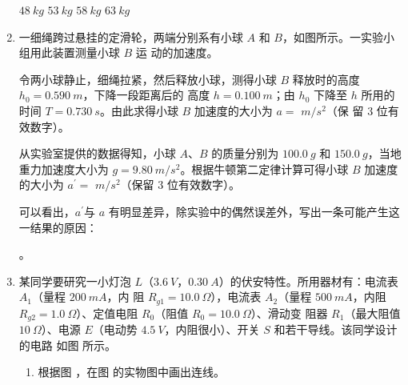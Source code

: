 \begin{enumerate}
\fourchoices
{$ 48 \ kg $}
{$ 53 \ kg $}
{$ 58 \ kg $}
{$ 63 \ kg $}



\gaokaosy


\item 
一细绳跨过悬挂的定滑轮，两端分别系有小球 $ A $ 和 $ B $，如图所示。一实验小组用此装置测量小球 $ B $ 运
动的加速度。
\begin{figure}[h!]
\centering

\end{figure}

令两小球静止，细绳拉紧，然后释放小球，测得小球 $ B $ 释放时的高度 $ h_{0} =0.590 \ m $，下降一段距离后的
高度 $ h=0.100 \ m $；由 $ h_{0} $ 下降至 $ h $ 所用的时间 $ T=0.730 \ s $。由此求得小球 $ B $ 加速度的大小为 $ a=$ \underlinegap $m/s^{2} $（保
留 $ 3 $ 位有效数字）。

从实验室提供的数据得知，小球 $ A $、$ B $ 的质量分别为 $ 100.0 \ g $ 和 $ 150.0 \ g $，当地重力加速度大小为 $ g=9.80 \ m/s^{2} $。根据牛顿第二定律计算可得小球 $ B $ 加速度的大小为 $ a ^{\prime}= $ \underlinegap $m/s^{2} $（保留 $ 3 $ 位有效数字）。

可以看出，$ a ^{\prime} $与 $ a $ 有明显差异，除实验中的偶然误差外，写出一条可能产生这一结果的原因： \hfullline 

\hfullline 。




\newpage
\item
某同学要研究一小灯泡 $ L $（$ 3.6 \ V $，$ 0.30 \ A $）的伏安特性。所用器材有：电流表 $ A_{1} $（量程 $ 200 \ mA $，内
阻 $ R_{g1} =10.0 \ \Omega $），电流表 $ A_{2} $（量程 $ 500 \ mA $，内阻 $ R_{g2} =1.0 \ \Omega $）、定值电阻 $ R_{0} $（阻值 $ R_{0} =10.0 \ \Omega $）、滑动变
阻器 $ R_{1} $（最大阻值 $ 10 \ \Omega $）、电源 $ E $（电动势 $ 4.5 \ V $，内阻很小）、开关 $ S $ 和若干导线。该同学设计的电路
如图  所示。


\begin{enumerate}
\item
根据图  ，在图  的实物图中画出连线。
\begin{figure}[h!]
\centering
\begin{subfigure}{0.4\linewidth}
\centering
 
\caption{}\label{2020:全国2:10a}
\end{subfigure}
\hfil
\begin{subfigure}{0.4\linewidth}
\centering
 
\caption{}\label{2020:全国2:10b}
\end{subfigure}
\end{figure}


\end{enumerate}
\end{enumerate}
